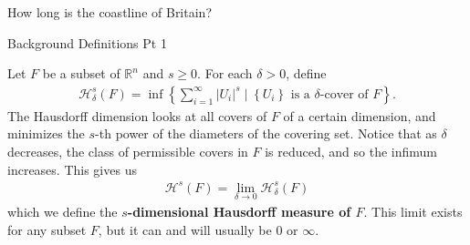 \documentclass[10pt]{beamer}
\begin{document}
\begin{frame}{How long is the coastline of Britain?}
\end{frame}

\begin{frame}{Background Definitions Pt 1}
	
	\begin{definition}
	Let \(F\) be a subset of \(\mathbb{R}^{n}\) and \(s\geq 0\). For each \(\delta>0\), define
	\begin{align*}
		\mathcal{H}^{s}_{\delta}(F) = \inf \left\{\sum_{i=1}^{\infty} \left| U_i \right|^{s} \mid \left\{ U_i \right\} \text{ is a \(\delta\)-cover of \(F\)} \right\} .
	\end{align*}
The Hausdorff dimension looks at all covers of \(F\) of a certain dimension, and minimizes the \(s\)-th power of the diameters of the covering set. Notice that as \(\delta\) decreases, the class of permissible covers in \(F\) is reduced, and so the infimum increases. This gives us
\begin{align*}
	\mathcal{H}^{s}(F) = \lim_{\delta \to 0} \mathcal{H}^{s}_{\delta}(F)
\end{align*}
which we define the \textbf{\(s\)-dimensional Hausdorff measure of \(F\)}. This limit exists for any subset \(F\), but it can and will usually be \(0\) or \(\infty\).
\end{definition}

\end{frame}
\end{document}
